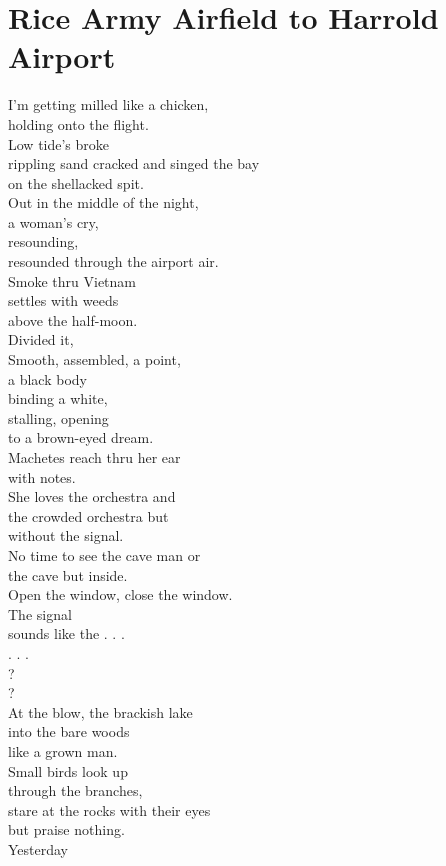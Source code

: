 \documentclass[smalldemyvopaper,11pt,twoside,onecolumn,openright,extrafontsizes]{memoir}
\begin{document}
\chapter{Rice Army Airfield to Harrold Airport}
I'm getting milled like a chicken,
\\holding onto the flight.
\\Low tide's broke
\\rippling sand cracked and singed the bay
\\on the shellacked spit.
\\Out in the middle of the night,
\\a woman's cry,
\\resounding,
\\resounded through the airport air.
\\Smoke thru Vietnam
\\settles with weeds
\\above the half-moon.
\\Divided it,
\\Smooth, assembled, a point,
\\a black body
\\binding a white,
\\stalling, opening
\\to a brown-eyed dream.
\\Machetes reach thru her ear
\\with notes.
\\She loves the orchestra and
\\the crowded orchestra but
\\without the signal.
\\No time to see the cave man or
\\the cave but inside.
\\Open the window, close the window.
\\The signal
\\sounds like the . . .
\\. . .
\\?
\\?
\\At the blow, the brackish lake
\\into the bare woods
\\like a grown man.
\\Small birds look up
\\through the branches,
\\stare at the rocks with their eyes
\\but praise nothing.
\\Yesterday
\end{document}
